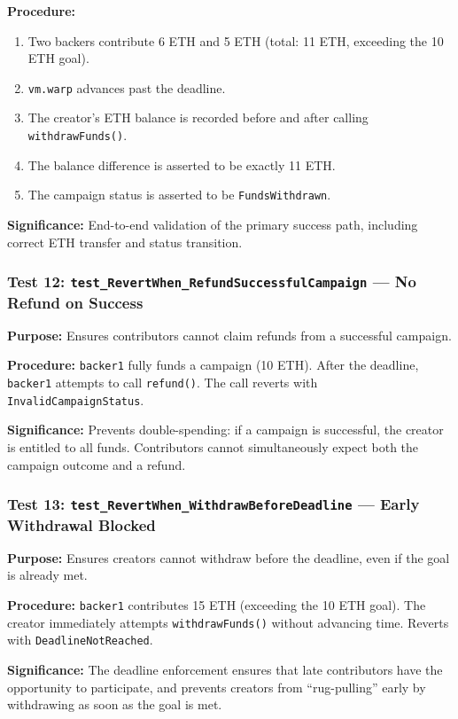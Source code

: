 \textbf{Procedure:}
\begin{enumerate}[leftmargin=1.5em]
    \item Two backers contribute 6 ETH and 5 ETH (total: 11 ETH, exceeding the 10 ETH goal).
    \item \texttt{vm.warp} advances past the deadline.
    \item The creator's ETH balance is recorded before and after calling \texttt{withdrawFunds()}.
    \item The balance difference is asserted to be exactly 11 ETH.
    \item The campaign status is asserted to be \texttt{FundsWithdrawn}.
\end{enumerate}

\textbf{Significance:} End-to-end validation of the primary success path, including correct ETH transfer and status transition.

\subsubsection{Test 12: \texttt{test\_RevertWhen\_RefundSuccessfulCampaign} --- No Refund on Success}

\textbf{Purpose:} Ensures contributors cannot claim refunds from a successful campaign.

\textbf{Procedure:} \texttt{backer1} fully funds a campaign (10 ETH). After the deadline, \texttt{backer1} attempts to call \texttt{refund()}. The call reverts with \texttt{InvalidCampaignStatus}.

\textbf{Significance:} Prevents double-spending: if a campaign is successful, the creator is entitled to all funds. Contributors cannot simultaneously expect both the campaign outcome and a refund.

\subsubsection{Test 13: \texttt{test\_RevertWhen\_WithdrawBeforeDeadline} --- Early Withdrawal Blocked}

\textbf{Purpose:} Ensures creators cannot withdraw before the deadline, even if the goal is already met.

\textbf{Procedure:} \texttt{backer1} contributes 15 ETH (exceeding the 10 ETH goal). The creator immediately attempts \texttt{withdrawFunds()} without advancing time. Reverts with \texttt{DeadlineNotReached}.

\textbf{Significance:} The deadline enforcement ensures that late contributors have the opportunity to participate, and prevents creators from ``rug-pulling'' early by withdrawing as soon as the goal is met.

